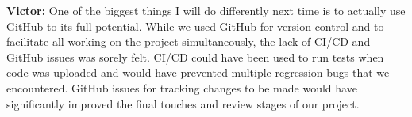 \documentclass{article}
\begin{document}
\textbf{Victor:} One of the biggest things I will do differently next time is to actually use GitHub to its full potential. While we used GitHub for version control and to 
facilitate all working on the project simultaneously, the lack of CI/CD and GitHub issues was sorely felt. CI/CD could have been used to run tests when code was uploaded and 
would have prevented multiple regression bugs that we encountered. GitHub issues for tracking changes to be made would have significantly improved the final touches and review 
stages of our project.
\end{document}
